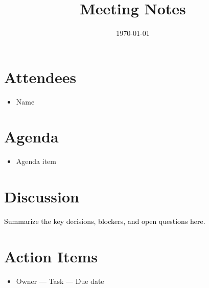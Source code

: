 \documentclass[11pt,a4paper]{article}
\title{Meeting Notes}
\author{}
\date{\today}
\begin{document}
\maketitle

\section*{Attendees}

\begin{itemize}
\item Name
\end{itemize}

\section*{Agenda}

\begin{itemize}
\item Agenda item
\end{itemize}

\section*{Discussion}

\textcolor{black}{Summarize the key decisions, blockers, and open questions here.}

\section*{Action Items}

\begin{itemize}
\item Owner --- Task --- Due date
\end{itemize}
\end{document}
